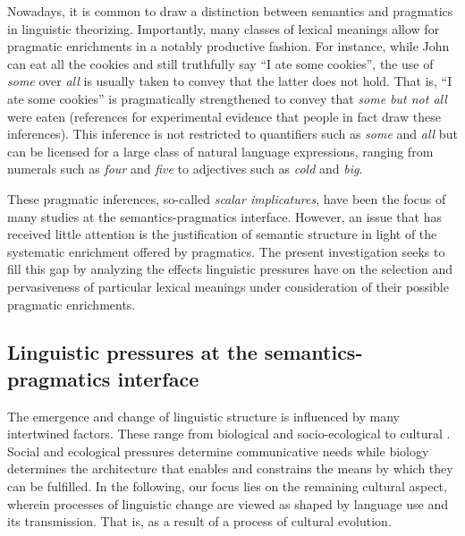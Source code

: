 \documentclass[a4paper]{article}
\newcommand{\hl}[1]{\textcolor[rgb]{.8,.33,.0}{#1}}%
\begin{document}
Nowadays, it is common to draw a distinction between semantics and pragmatics in linguistic theorizing. Importantly, many classes of lexical meanings allow for pragmatic enrichments in a notably productive fashion. For instance, while John can eat all the cookies and still truthfully say ``I ate some cookies'', the use of {\em some} over {\em all} is usually taken to convey that the latter does not hold. That is, ``I ate some cookies'' is pragmatically strengthened to convey that {\em some but not all} were eaten (\hl{references for experimental evidence that people in fact draw these inferences}). This inference is not restricted to quantifiers such as {\em some} and {\em all} but can be licensed for a large class of natural language expressions,  ranging from numerals such as {\em four} and {\em five} to adjectives such as {\em cold} and {\em big}.

These pragmatic inferences, so-called {\em scalar implicatures}, have been the focus of many studies at the semantics-pragmatics interface. However, an issue that has received little attention is the justification of semantic structure in light of the systematic enrichment offered by pragmatics. The present investigation seeks to fill this gap by analyzing the effects linguistic pressures have on the selection and pervasiveness of particular lexical meanings under consideration of their possible pragmatic enrichments.

\subsection{Linguistic pressures at the semantics-pragmatics interface}
The emergence and change of linguistic structure is influenced by many intertwined factors. These range from biological and socio-ecological to cultural \citep{steels:2011}. Social and ecological pressures determine communicative needs while biology determines the architecture that enables and constrains the means by which they can be fulfilled. In the following, our focus lies on the remaining cultural aspect, wherein processes of linguistic change are viewed as shaped by language use and its transmission. That is, as a result of a process of cultural evolution. 
\end{document}
